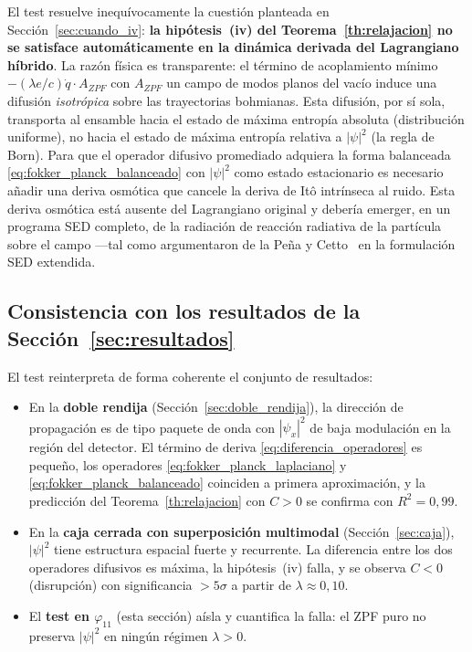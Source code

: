 \documentclass[11pt,a4paper]{article}
\begin{document}
El test resuelve inequívocamente la cuestión planteada en
Sección~\ref{sec:cuando_iv}: \textbf{la hipótesis~(iv) del
Teorema~\ref{th:relajacion} no se satisface automáticamente en la
dinámica derivada del Lagrangiano híbrido}. La razón física es
transparente: el término de acoplamiento mínimo
$-(\lambda e/c)\dot q\cdot A_{ZPF}$ con $A_{ZPF}$ un campo de modos
planos del vacío induce una difusión \emph{isotrópica} sobre las
trayectorias bohmianas. Esta difusión, por sí sola, transporta al
ensamble hacia el estado de máxima entropía absoluta (distribución
uniforme), no hacia el estado de máxima entropía relativa a $|\psi|^2$
(la regla de Born). Para que el operador difusivo promediado adquiera
la forma balanceada \eqref{eq:fokker_planck_balanceado} con $|\psi|^2$
como estado estacionario es necesario añadir una deriva osmótica que
cancele la deriva de Itô intrínseca al ruido. Esta deriva osmótica
está ausente del Lagrangiano original y debería emerger, en un
programa SED completo, de la radiación de reacción radiativa de la
partícula sobre el campo ---tal como argumentaron de la Peña y
Cetto~\cite{delaPenaCetto1996} en la formulación SED extendida.

\subsection{Consistencia con los resultados de la Sección~\ref{sec:resultados}}
\label{sec:consistencia}

El test reinterpreta de forma coherente el conjunto de resultados:
\begin{itemize}
\item En la \textbf{doble rendija} (Sección~\ref{sec:doble_rendija}),
la dirección de propagación es de tipo paquete de onda con $|\psi_x|^2$
de baja modulación en la región del detector. El término de deriva
\eqref{eq:diferencia_operadores} es pequeño, los operadores
\eqref{eq:fokker_planck_laplaciano} y
\eqref{eq:fokker_planck_balanceado} coinciden a primera aproximación,
y la predicción del Teorema~\ref{th:relajacion} con $C>0$ se confirma
con $R^2=0{,}99$.
\item En la \textbf{caja cerrada con superposición multimodal}
(Sección~\ref{sec:caja}), $|\psi|^2$ tiene estructura espacial fuerte
y recurrente. La diferencia entre los dos operadores difusivos es
máxima, la hipótesis~(iv) falla, y se observa $C<0$ (disrupción) con
significancia $>5\sigma$ a partir de $\lambda\approx 0{,}10$.
\item El \textbf{test en $\varphi_{11}$} (esta sección) aísla y
cuantifica la falla: el ZPF puro no preserva $|\psi|^2$ en ningún
régimen $\lambda>0$.
\end{itemize}
\end{document}
